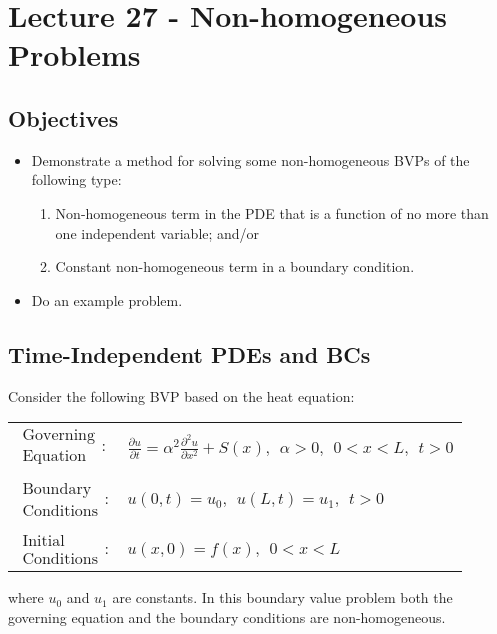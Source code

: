 \chapter{Lecture 27 - Non-homogeneous Problems}
\label{ch:lec27}
\section{Objectives}
\begin{itemize}
\item Demonstrate a method for solving some non-homogeneous BVPs of the following type:
\begin{enumerate}
\item Non-homogeneous term in the PDE that is a function of no more than one independent variable; and/or
\item Constant non-homogeneous term in a boundary condition.
\end{enumerate}
\item Do an example problem.
\end{itemize}
\setcounter{lstannotation}{0} %

\section{Time-Independent PDEs and BCs}
Consider the following BVP based on the heat equation:
\begin{table}
\begin{tabular}{l l}
$\substack{\text{Governing} \\\text{Equation}}: $& $\frac{\partial u}{\partial t} = \alpha^2 \frac{\partial^2 u}{\partial x^2} + S(x), \ \ \alpha>0, \ \ 0<x<L, \ \ t>0$ \\
& \\
$\substack{\text{Boundary} \\ \text{Conditions}}: $& $u(0,t)=u_0, \ \ u(L,t) = u_1, \ \ t>0$\\
& \\
$\substack{\text{Initial} \\ \text{Conditions}}: $ & $u(x,0) = f(x), \ \ 0<x<L $ \\
\end{tabular}
\end{table}
where $u_0$ and $u_1$ are constants.  In this boundary value problem both the governing equation and the boundary conditions are non-homogeneous.  


